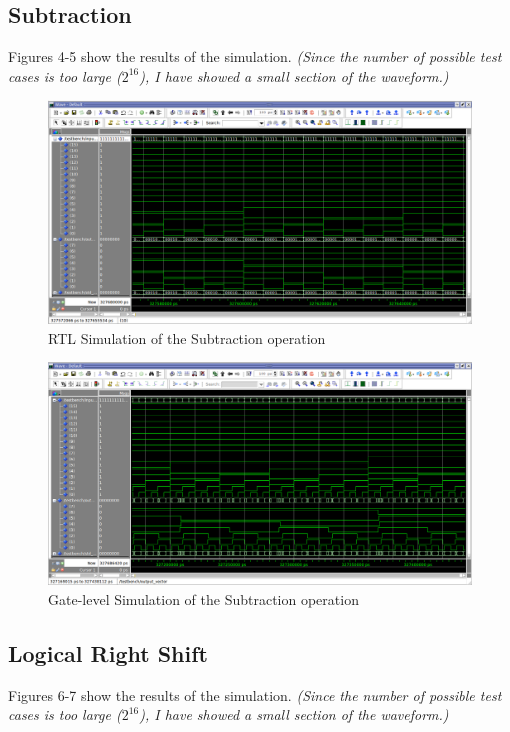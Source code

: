 \documentclass[a4paper, 11pt]{article}
\begin{document}
\subsection{Subtraction}
Figures 4-5 show the results of the simulation. \emph{(Since the number of possible test cases is too large ($2^{16}$), I have showed a small section of the waveform.)}

\begin{figure}[h]
\centering
\includegraphics[scale=0.33]{Subtractor_RTL}
\caption{RTL Simulation of the Subtraction operation}
\end{figure}

\begin{figure}[h]
\centering
\includegraphics[scale=0.33]{Subtractor_Gate}
\caption{Gate-level Simulation of the Subtraction operation}
\end{figure}

\subsection{Logical Right Shift}
Figures 6-7 show the results of the simulation. \emph{(Since the number of possible test cases is too large ($2^{16}$), I have showed a small section of the waveform.)}
\end{document}
